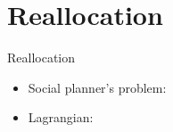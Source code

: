 \documentclass[aspectratio=169]{beamer}
\begin{document}
\section{Reallocation}
\begin{frame}{Reallocation}
	\begin{itemize}
		\item Social planner's problem:
			
		\item Lagrangian:
			
	\end{itemize}
\end{frame}
% 			
% 			
\end{document}
